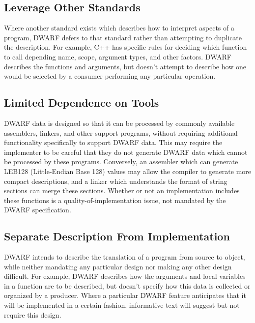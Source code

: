 \subsection{Leverage Other Standards}
Where another standard exists which describes how to interpret 
aspects of a program, DWARF defers to that standard rather than 
attempting to duplicate the description.  For example, C++ has 
\bb
specific 
\eb
rules for deciding which function to call depending 
name, scope, argument types, and other factors.  DWARF describes 
the functions and arguments, but doesn't attempt to describe 
how one would be selected by a consumer performing any particular 
operation.

\subsection{Limited Dependence on Tools}
DWARF data is designed so that it can be processed by commonly 
available assemblers, linkers, and other support programs, 
without requiring additional functionality specifically to 
support DWARF data.  This may require the implementer to be 
careful that they do not generate DWARF data which cannot be 
processed by these programs.  Conversely, an assembler which 
can generate LEB128 
\bb
(Little-Endian Base 128) 
\eb
values may allow the compiler to generate 
more compact descriptions, and a linker which understands the 
format of string sections can merge these sections.  Whether 
or not an implementation includes these functions is a 
\bb
quality-of-implementation 
\eb
issue, not mandated by the DWARF specification.

\subsection{Separate Description From Implementation}
DWARF intends to describe the translation of a program from 
source to object, while neither mandating any particular design 
nor making any other design difficult.  For example, DWARF 
describes how the arguments and local variables in a function 
are to be described, but doesn't specify how this data is 
collected or organized by a producer.  Where a particular DWARF 
feature anticipates that it will be implemented in a certain 
fashion, 
\bb
informative 
\eb
text will suggest but not require this design.

\bb 
